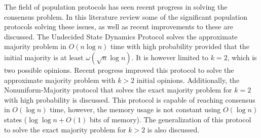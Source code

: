 \documentclass[english, 12pt, a4paper, sci, utf8, a-1b, online]{aaltothesis}
\date{\today}
\theoremstyle{definition}
\theoremstyle{remark}
\begin{document}
\makecoverpage


\makecopyrightpage




\begin{abstractpage}[english]
    The field of population protocols has seen recent progress in solving the consensus problem. In this literature review some of the significant population protocols solving these issues, as well as recent improvements to these are discussed. The Undecided State Dynamics Protocol solves the approximate majority problem in $O(n \log n)$ time with high probability provided that the initial majority is at least $\omega(\sqrt{n} \log n)$. It is however limited to $k = 2$, which is two possible opinions. Recent progress improved this protocol to solve the approximate majority problem with $k > 2$ initial opinions. Additionally, the Nonuniform-Majority protocol that solves the exact majority problem for $k = 2$ with high probability is discussed. This protocol is capable of reaching consensus in $O(\log n)$ time, however, the memory usage is not constant using $O(\log n)$ states ($\log \log n + O(1)$ bits of memory). The generalization of this protocol to solve the exact majority problem for $k > 2$ is also discussed.
\end{abstractpage}

\newpage
\end{document}
